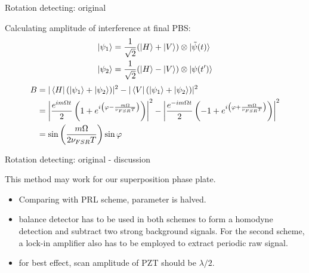 \documentclass[amssymb, amsmath]{beamer}
\begin{document}
\begin{frame}{Rotation detecting: original}

Calculating amplitude of interference at final PBS:
\begin{subequations}
\begin{align}
    \ket{\psi_1} &= \frac{1}{\sqrt{2}}(\ket H + \ket V)\otimes\ket{\tilde{\psi}(t)} \\
    \ket{\psi_2} &= \frac{1}{\sqrt{2}}(\ket H - \ket V)\otimes\ket{\psi(t^\prime)}
\end{align}
\end{subequations}    
\begin{align}
    B &= |\bra{H}(\ket{\psi_1}+\ket{\psi_2})|^2 - |\bra{V}(\ket{\psi_1}+\ket{\psi_2})|^2 \nonumber\\
    &= \left|\frac{e^{i m \Omega t}}{2}\left(1+e^{i\left(\varphi-\frac{m \Omega}{\nu_{FSR}T}\right)}\right)\right|^2 - \left|\frac{e^{-i m \Omega t}}{2}\left(-1+e^{i\left(\varphi+\frac{m \Omega}{\nu_{FSR}T}\right)}\right)\right|^2 \nonumber\\
    &= \sin\left(\frac{m \Omega}{2 \nu_{FSR}T}\right)\sin \varphi
\end{align}
\end{frame}

\begin{frame}{Rotation detecting: original - discussion}

This method may work for our superposition phase plate.
\begin{itemize}
    \item Comparing with PRL scheme, parameter is halved.
    \item balance detector has to be used in both schemes to form a homodyne detection and subtract two strong background signals. For the second scheme, a lock-in amplifier also has to be employed to extract periodic raw signal. 
    \item for best effect, scan amplitude of PZT should be $\lambda/2$.
\end{itemize}

    
\end{frame}
\end{document}
